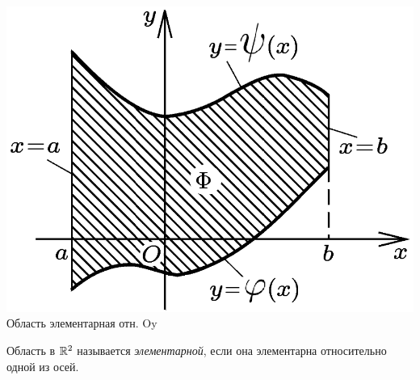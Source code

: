 \begin{minipage}{0.4\textwidth}
\vspace{1cm}
\hspace{0.005\textwidth}
\includegraphics[width=\textwidth]{images/scren_16.png}
Область элементарная отн. Oy
\end{minipage}

\begin{definition}
    Область в $\mathbb{R}^2$ называется \textit{элементарной}, если она элементарна относительно одной из осей.
\end{definition}

